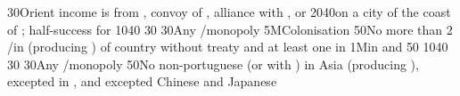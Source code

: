{}{30}{Orient income is from , convoy of \villeIzmir,
  alliance with \paysaden, \paysoman or \paysgujarat}%
%
 
%
%
{20}{40}{\COL on a city of the coast of \continentIndia; half-success for
  \granderegionCeylan}%
%
%
{10}{40}{}%
%
%
{}{30}{}%
%
%
{}{30}{Any \CTZ/\STZ monopoly}%
%
\EUobjective5M{Colonisation}{}%
{}{50}{No more than 2 \COL/\TP in \continentAsia (producing \POSPICE) of
  country without treaty and at least one \COL in \continentBrazil}%
%
%
%
\EUobjective1M{\TP in \payschine and \paysjapon}{}%
{}{50}{}%
%
%
{10}{40}{}%
%
%
{}{30}{}%
%
%
{}{30}{Any \CTZ/\STZ monopoly}%
%
%
{}{50}{No non-portuguese \TP (or with \dipAT) in Asia (producing \POSPICE),
  excepted in , and excepted Chinese and Japanese
  \TP}%

\makeatother

